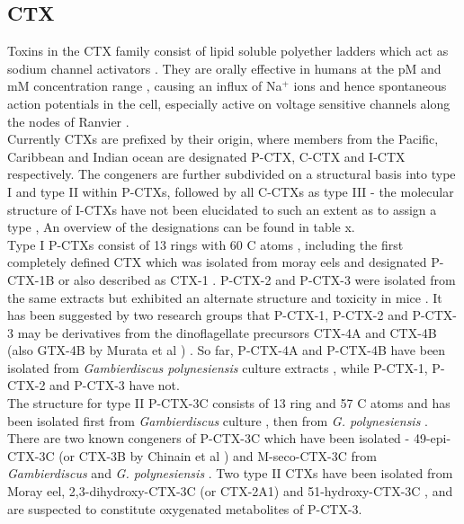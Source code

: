 \documentclass[12pt]{article}
\begin{document}
\subsection{CTX}
Toxins in the CTX family consist of lipid soluble polyether ladders which act as sodium channel activators \cite{dechraoui1999ciguatoxins}. They are orally effective in humans at the pM and mM concentration range \cite{molgo2000ciguatera}, causing an influx of Na$^{+}$ ions and hence spontaneous action potentials in the cell, especially active on voltage sensitive channels along the nodes of Ranvier \cite{sims1987theoretical,mattei1999neurotoxins,lewis1992action,molgo2000ciguatera}. \\	   
Currently CTXs are prefixed by their origin, where members from the Pacific, Caribbean and Indian ocean are designated P-CTX, C-CTX and I-CTX respectively. %
The congeners are further subdivided on a structural basis into type I and type II within P-CTXs, followed by all C-CTXs as type III - the molecular structure of I-CTXs have not been elucidated to such an extent as to assign a type \cite{legrand1997two,hamilton2002multiple,hamilton2002isolation}, An overview of the designations can be found in table x.  \\
Type I P-CTXs consist of 13 rings with 60 C atoms \cite{murata1990structures,lewis1991purification,lewis1993origin}, including the first completely defined CTX which was isolated from moray eels and designated P-CTX-1B \cite{murata1990structures} or also described as CTX-1 \cite{lewis1991purification}. P-CTX-2 and P-CTX-3 were isolated from the same extracts but exhibited an alternate structure and toxicity in mice \cite{lewis1991purification}. It has been suggested by two research groups that P-CTX-1, P-CTX-2 and P-CTX-3 may be derivatives from the dinoflagellate precursors CTX-4A and CTX-4B (also GTX-4B by Murata et al \cite{murata1990structures}) \cite{lewis1993origin,yasumoto2000structural}. So far, P-CTX-4A and P-CTX-4B have been isolated from \emph{Gambierdiscus polynesiensis} culture extracts \cite{chinain2010growth}, while P-CTX-1, P-CTX-2 and P-CTX-3 have not. \\
The structure for type II P-CTX-3C consists of 13 ring and 57 C atoms and has been isolated first from \emph{Gambierdiscus} culture \cite{satake1993structure}, then from \emph{G. polynesiensis} \cite{chinain2010growth}. There are two known congeners of P-CTX-3C which have been isolated - 49-epi-CTX-3C (or CTX-3B by Chinain et al \cite{chinain2010growth}) and M-seco-CTX-3C from \emph{Gambierdiscus} \cite{satake1993structure} and \emph{G. polynesiensis} \cite{chinain2010growth}. Two type II CTXs have been isolated from Moray eel, 2,3-dihydroxy-CTX-3C (or CTX-2A1) and 51-hydroxy-CTX-3C \cite{satake1998isolation}, and are suspected to constitute oxygenated metabolites of P-CTX-3. \\ %
\end{document}
